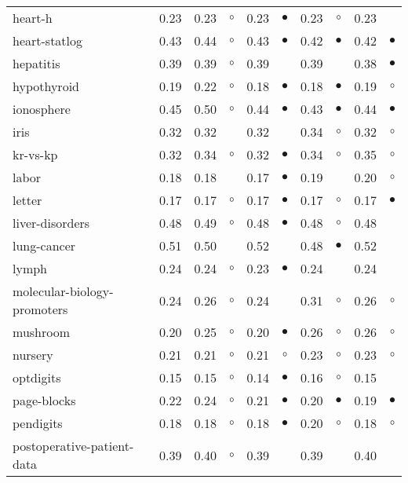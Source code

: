 \begin{table}[H]
{\begin{tabular}{lrr@{\hspace{0.1cm}}cr@{\hspace{0.1cm}}cr@{\hspace{0.1cm}}cr@{\hspace{0.1cm}}c}
heart-h & 0.23 & 0.23 &   $\circ$ & 0.23 & $\bullet$ & 0.23 &   $\circ$ & 0.23 &           \\
heart-statlog & 0.43 & 0.44 &   $\circ$ & 0.43 & $\bullet$ & 0.42 & $\bullet$ & 0.42 &  $\bullet$\\
hepatitis & 0.39 & 0.39 &   $\circ$ & 0.39 &           & 0.39 &           & 0.38 &  $\bullet$\\
hypothyroid & 0.19 & 0.22 &   $\circ$ & 0.18 & $\bullet$ & 0.18 & $\bullet$ & 0.19 &    $\circ$\\
ionosphere & 0.45 & 0.50 &   $\circ$ & 0.44 & $\bullet$ & 0.43 & $\bullet$ & 0.44 &  $\bullet$\\
iris & 0.32 & 0.32 &           & 0.32 &           & 0.34 &   $\circ$ & 0.32 &    $\circ$\\
kr-vs-kp & 0.32 & 0.34 &   $\circ$ & 0.32 & $\bullet$ & 0.34 &   $\circ$ & 0.35 &    $\circ$\\
labor & 0.18 & 0.18 &           & 0.17 & $\bullet$ & 0.19 &           & 0.20 &    $\circ$\\
letter & 0.17 & 0.17 &   $\circ$ & 0.17 & $\bullet$ & 0.17 &   $\circ$ & 0.17 &  $\bullet$\\
liver-disorders & 0.48 & 0.49 &   $\circ$ & 0.48 & $\bullet$ & 0.48 &   $\circ$ & 0.48 &           \\
lung-cancer & 0.51 & 0.50 &           & 0.52 &           & 0.48 & $\bullet$ & 0.52 &           \\
lymph & 0.24 & 0.24 &   $\circ$ & 0.23 & $\bullet$ & 0.24 &           & 0.24 &           \\
molecular-biology-promoters & 0.24 & 0.26 &   $\circ$ & 0.24 &           & 0.31 &   $\circ$ & 0.26 &    $\circ$\\
mushroom & 0.20 & 0.25 &   $\circ$ & 0.20 & $\bullet$ & 0.26 &   $\circ$ & 0.26 &    $\circ$\\
nursery & 0.21 & 0.21 &   $\circ$ & 0.21 &   $\circ$ & 0.23 &   $\circ$ & 0.23 &    $\circ$\\
optdigits & 0.15 & 0.15 &   $\circ$ & 0.14 & $\bullet$ & 0.16 &   $\circ$ & 0.15 &           \\
page-blocks & 0.22 & 0.24 &   $\circ$ & 0.21 & $\bullet$ & 0.20 & $\bullet$ & 0.19 &  $\bullet$\\
pendigits & 0.18 & 0.18 &   $\circ$ & 0.18 & $\bullet$ & 0.20 &   $\circ$ & 0.18 &    $\circ$\\
postoperative-patient-data & 0.39 & 0.40 &   $\circ$ & 0.39 &           & 0.39 &           & 0.40 &           \\

\end{tabular}}
\end{table}
